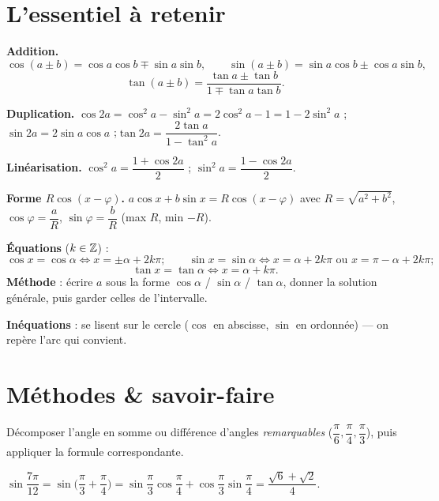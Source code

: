 \section{L'essentiel à retenir}

\begin{synthese}
\textbf{Addition.}
\[
  \cos(a\pm b)=\cos a\cos b\mp\sin a\sin b,\qquad
  \sin(a\pm b)=\sin a\cos b\pm\cos a\sin b,
\]
\[
  \tan(a\pm b)=\frac{\tan a\pm\tan b}{1\mp\tan a\tan b}.
\]

\smallskip
\textbf{Duplication.} $\cos 2a=\cos^2 a-\sin^2 a=2\cos^2 a-1=1-2\sin^2 a$ ;\quad
$\sin 2a=2\sin a\cos a$ ;\quad $\tan 2a=\dfrac{2\tan a}{1-\tan^2 a}$.

\smallskip
\textbf{Linéarisation.} $\cos^2 a=\dfrac{1+\cos 2a}{2}$ ;\quad
$\sin^2 a=\dfrac{1-\cos 2a}{2}$.

\smallskip
\textbf{Forme $R\cos(x-\varphi)$.} $a\cos x+b\sin x=R\cos(x-\varphi)$ avec
$R=\sqrt{a^2+b^2}$, $\cos\varphi=\dfrac aR$, $\sin\varphi=\dfrac bR$
(max $R$, min $-R$).

\smallskip
\textbf{Équations} ($k\in\mathbb{Z}$) :
\[
  \cos x=\cos\alpha \iff x=\pm\alpha+2k\pi;\qquad
  \sin x=\sin\alpha \iff x=\alpha+2k\pi \text{ ou } x=\pi-\alpha+2k\pi;
\]
\[
  \tan x=\tan\alpha \iff x=\alpha+k\pi.
\]
\textbf{Méthode} : écrire $a$ sous la forme $\cos\alpha$ / $\sin\alpha$ /
$\tan\alpha$, donner la solution générale, puis garder celles de l'intervalle.

\smallskip
\textbf{Inéquations} : se lisent sur le cercle ($\cos$ en abscisse, $\sin$ en
ordonnée) — on repère l'arc qui convient.
\end{synthese}

\section{Méthodes \& savoir-faire}

Décomposer l'angle en somme ou différence d'angles \emph{remarquables}
($\dfrac{\pi}{6},\dfrac{\pi}{4},\dfrac{\pi}{3}$), puis appliquer la formule
correspondante.
\begin{exemple}
$\sin\dfrac{7\pi}{12}=\sin\!\Big(\dfrac{\pi}{3}+\dfrac{\pi}{4}\Big)
=\sin\dfrac{\pi}{3}\cos\dfrac{\pi}{4}+\cos\dfrac{\pi}{3}\sin\dfrac{\pi}{4}
=\dfrac{\sqrt6+\sqrt2}{4}.$
\end{exemple}


